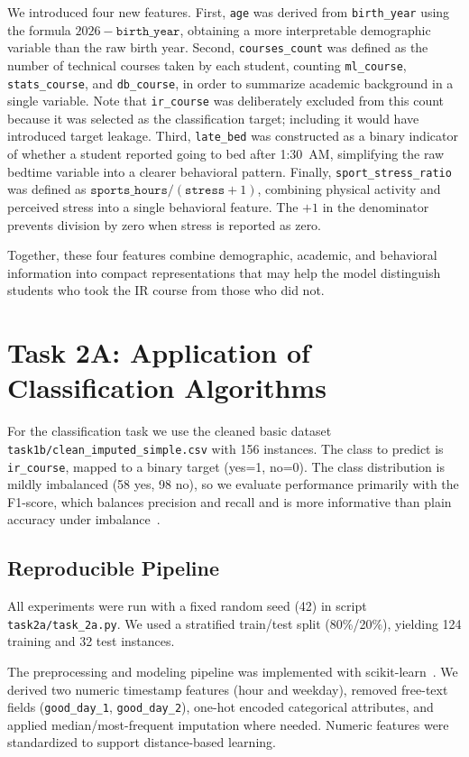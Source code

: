 \documentclass[runningheads]{llncs}
\begin{document}
We introduced four new features. First, \texttt{age} was derived from \texttt{birth\_year} using the formula $2026 - \texttt{birth\_year}$, obtaining a more interpretable demographic variable than the raw birth year. Second, \texttt{courses\_count} was defined as the number of technical courses taken by each student, counting \texttt{ml\_course}, \texttt{stats\_course}, and \texttt{db\_course}, in order to summarize academic background in a single variable. Note that \texttt{ir\_course} was deliberately excluded from this count because it was selected as the classification target; including it would have introduced target leakage. Third, \texttt{late\_bed} was constructed as a binary indicator of whether a student reported going to bed after 1:30~AM, simplifying the raw bedtime variable into a clearer behavioral pattern. Finally, \texttt{sport\_stress\_ratio} was defined as $\texttt{sports\_hours} / (\texttt{stress} + 1)$, combining physical activity and perceived stress into a single behavioral feature. The $+1$ in the denominator prevents division by zero when stress is reported as zero.

Together, these four features combine demographic, academic, and behavioral information into compact representations that may help the model distinguish students who took the IR course from those who did not.

\section{Task 2A: Application of Classification Algorithms}
For the classification task we use the cleaned basic dataset \texttt{task1b/clean\_imputed\_simple.csv} with 156 instances. The class to predict is \texttt{ir\_course}, mapped to a binary target (yes=1, no=0). The class distribution is mildly imbalanced (58 yes, 98 no), so we evaluate performance primarily with the F1-score, which balances precision and recall and is more informative than plain accuracy under imbalance~\cite{rijsbergen_1979}.

\subsection*{Reproducible Pipeline}
All experiments were run with a fixed random seed (42) in script \texttt{task2a/task\_2a.py}. We used a stratified train/test split (80\%/20\%), yielding 124 training and 32 test instances.

The preprocessing and modeling pipeline was implemented with scikit-learn~\cite{pedregosa_2011}. We derived two numeric timestamp features (hour and weekday), removed free-text fields (\texttt{good\_day\_1}, \texttt{good\_day\_2}), one-hot encoded categorical attributes, and applied median/most-frequent imputation where needed. Numeric features were standardized to support distance-based learning.
\end{document}
